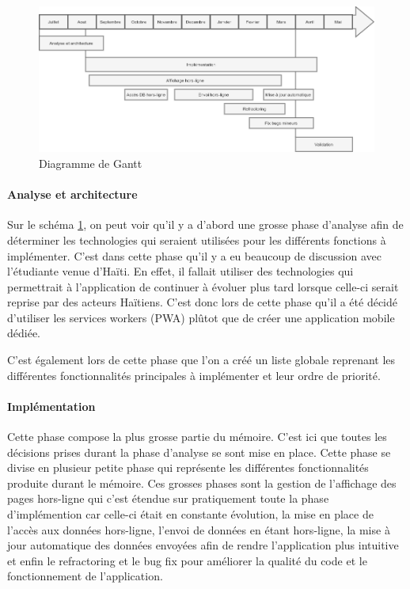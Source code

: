 \documentclass{EPL-master-thesis-covers-FR}
\begin{document}
			\begin{figure}[H]
					\centering
					\includegraphics[width=1\textwidth]{images/Gantt}
					\caption{Diagramme de Gantt}
					\label{fig:Gantt}
				\end{figure}
				
			\paragraph*{Analyse et architecture}
			Sur le schéma \ref{fig:Gantt}, on peut voir qu'il y a d'abord une grosse phase d'analyse afin de déterminer les technologies qui seraient utilisées pour les différents fonctions à implémenter. C'est dans cette phase qu'il y a eu beaucoup de discussion avec l'étudiante venue d'Haïti. En effet, il fallait utiliser des technologies qui permettrait à l'application de continuer à évoluer plus tard lorsque celle-ci serait reprise par des acteurs Haïtiens.
				C'est donc lors de cette phase qu'il a été décidé d'utiliser les services workers (PWA) plûtot que de créer une application mobile dédiée.
			
			C'est également lors de cette phase que l'on a créé un liste globale reprenant les différentes fonctionnalités principales à implémenter et leur ordre de priorité.
			
			\paragraph*{Implémentation} 
			Cette phase compose la plus grosse partie du mémoire. C'est ici que toutes les décisions prises durant la phase d'analyse se sont mise en place. Cette phase se divise en plusieur petite phase qui représente les différentes fonctionnalités produite durant le mémoire. Ces grosses phases sont la gestion de l'affichage des pages hors-ligne qui c'est étendue sur pratiquement toute la phase d'implémention car celle-ci était en constante évolution, la mise en place de l'accès aux données hors-ligne, l'envoi de données en étant hors-ligne, la mise à jour automatique des données envoyées afin de rendre l'application plus intuitive et enfin le refractoring et le bug fix pour améliorer la qualité du code et le fonctionnement de l'application. 
			
\end{document}
